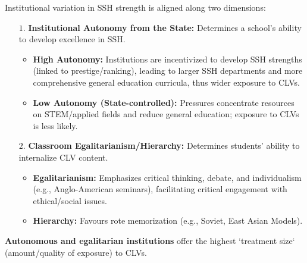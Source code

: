 \documentclass{article}
\begin{document}
    \noindent Institutional variation in SSH strength is aligned along two
dimensions:
    \begin{itemize}
        \item [$1$.] \textbf{Institutional Autonomy from the State:}
        Determines a school's ability to develop excellence in SSH.
        \begin{itemize}
            \item \textbf{High Autonomy:} Institutions are incentivized to
            develop SSH strengths (linked to prestige/ranking), leading to
            larger SSH departments and more comprehensive general education
            curricula, thus wider exposure to CLVs.
            \item \textbf{Low Autonomy (State-controlled):} Pressures
            concentrate resources on STEM/applied fields and reduce general
            education; exposure to CLVs is less likely.
        \end{itemize}
        \item[$2$.] \textbf{Classroom Egalitarianism/Hierarchy:} Determines
        students' ability to internalize CLV content.
        \begin{itemize}
            \item \textbf{Egalitarianism:} Emphasizes critical thinking,
            debate, and individualism (e.g., Anglo-American seminars),
            facilitating critical engagement with ethical/social issues.
            \item \textbf{Hierarchy:} Favours rote memorization (e.g.,
            Soviet, East Asian Models).
        \end{itemize}
    \end{itemize}

    \noindent \textbf{Autonomous and egalitarian institutions} offer the
highest `treatment size` (amount/quality of exposure) to CLVs.

    
\end{document}
